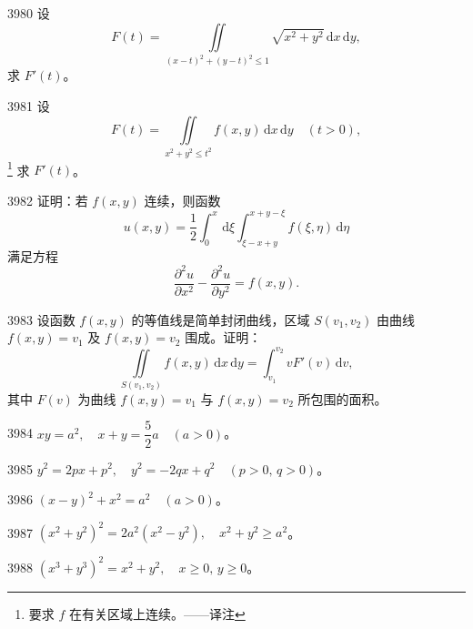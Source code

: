 \begin{prob}[S]{3980}
设
\[
F(t) = \iint\limits_{(x - t)^2 + (y - t)^2 \leqslant 1} \sqrt{x^2 + y^2} \,\mathrm{d}x\,\mathrm{d}y,
\]
求 $F'(t)$。
\end{prob}

\begin{prob}[S]{3981}
设
\[
F(t) = \iint\limits_{x^2 + y^2 \leqslant t^2} f(x, y) \,\mathrm{d}x\,\mathrm{d}y \quad (t > 0),
\]\footnote{要求 $f$ 在有关区域上连续。——译注}
求 $F'(t)$。
\end{prob}

\begin{prob}[M]{3982}
证明：若 $f(x, y)$ 连续，则函数
\[
u(x, y) = \frac{1}{2} \int_0^x \,\mathrm{d}\xi \int_{\xi - x + y}^{x + y - \xi} f(\xi, \eta) \,\mathrm{d}\eta
\]
满足方程
\[
\frac{\partial^2 u}{\partial x^2} - \frac{\partial^2 u}{\partial y^2} = f(x, y).
\]
\end{prob}

\begin{prob}[M]{3983}
设函数 $f(x, y)$ 的等值线是简单封闭曲线，区域 $S(v_1, v_2)$ 由曲线 $f(x, y) = v_1$ 及 $f(x, y) = v_2$ 围成。证明：
\[
\iint\limits_{S(v_1, v_2)} f(x, y) \,\mathrm{d}x\,\mathrm{d}y = \int_{v_1}^{v_2} v F'(v) \,\mathrm{d}v,
\]
其中 $F(v)$ 为曲线 $f(x, y) = v_1$ 与 $f(x, y) = v_2$ 所包围的面积。
\end{prob}



\begin{prob}[S]{3984}
$xy = a^2, \quad x + y = \dfrac{5}{2}a \quad (a > 0)$。
\end{prob}

\begin{prob}[S]{3985}
$y^2 = 2px + p^2, \quad y^2 = -2qx + q^2 \quad (p > 0, \, q > 0)$。
\end{prob}

\begin{prob}[S]{3986}
$(x - y)^2 + x^2 = a^2 \quad (a > 0)$。
\end{prob}


\begin{prob}[S]{3987}
$(x^2 + y^2)^2 = 2a^2(x^2 - y^2), \quad x^2 + y^2 \geqslant a^2$。
\end{prob}

\begin{prob}[S]{3988}
$(x^3 + y^3)^2 = x^2 + y^2, \quad x \geqslant 0, \, y \geqslant 0$。
\end{prob}


